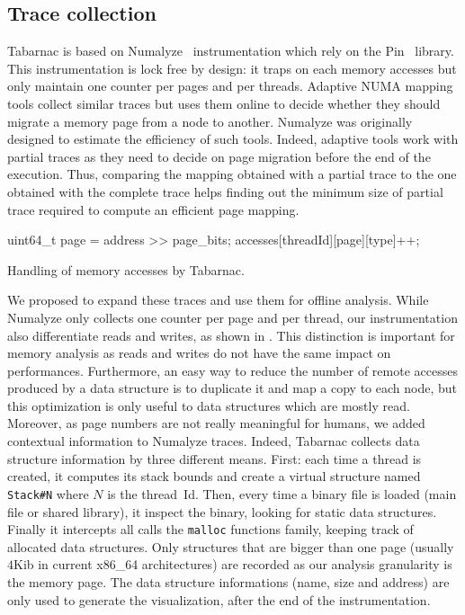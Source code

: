 \subsection{Trace collection}

\gls{Tabarnac} is based on \gls{Numalyze}~\cite{Diener15Characterizing} instrumentation which rely on the \gls{Pin}~\cite{Luk05Pin} library.
This instrumentation is lock free by design: it traps on each memory accesses but only maintain one counter per pages and per threads.
Adaptive \gls{NUMA} mapping tools collect similar traces but uses them online to decide whether they should migrate a memory page from a node to another.
\gls{Numalyze} was originally designed to estimate the efficiency of such tools.
Indeed, adaptive tools work with partial traces as they need to decide on page migration before the end of the execution.
Thus, comparing the mapping obtained with a partial trace to the one obtained with the complete trace helps finding out the minimum size of partial trace required to compute an efficient page mapping.

\begin{algorithm}[htb]
    \begin{algorithmic}
            \State uint64\_t page = address >> page\_bits;
            \State accesses[threadId][page][type]++;
        \EndFunction
    \end{algorithmic}
    \caption{Handling of memory accesses by Tabarnac.}
    \label{alg:Tabarnac}
\end{algorithm}

We proposed to expand these traces and use them for offline analysis.
While \gls{Numalyze} only collects one counter per page and per thread, our instrumentation also differentiate reads and writes, as shown in .
This distinction is important for memory analysis as reads and writes do not have the same impact on performances.
Furthermore, an easy way to reduce the number of remote accesses produced by a data structure is to duplicate it and map a copy to each node, but this optimization is only useful to data structures which are mostly read.
Moreover, as page numbers are not really meaningful for humans, we added contextual information to \gls{Numalyze} traces.
Indeed, \gls{Tabarnac} collects data structure information by three different means.
First: each time a thread is created, it computes its stack bounds and create a virtual structure named \texttt{Stack\#N} where $N$ is the thread~Id.
Then, every time a binary file is loaded (main file or shared library), it inspect the binary, looking for static data structures.
Finally it intercepts all calls the \texttt{malloc} functions family, keeping track of allocated data structures.
Only structures that are bigger than one page (usually $4$Kib in current x86\_64 architectures) are recorded as our analysis granularity is the memory page.
The data structure informations (name, size and address) are only used to generate the visualization, after the end of the instrumentation.

